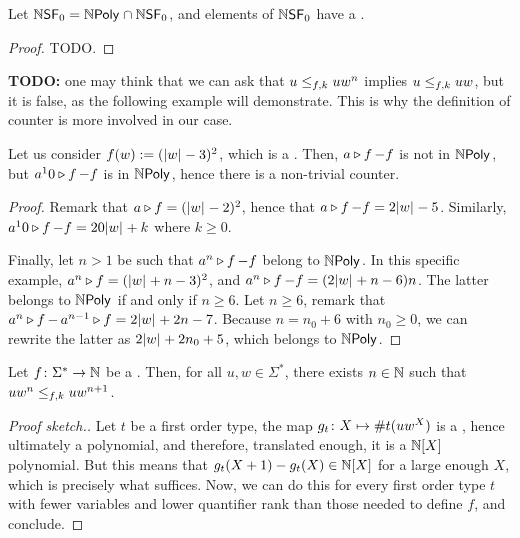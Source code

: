 \begin{lemma}
    Let $\NSF[0] = \NPoly \cap \NSF[0]$,
    and elements of $\NSF[0]$
    have a  .
\end{lemma}
\begin{proof}
    TODO.
\end{proof}


\textbf{TODO:} one may think that we can ask that $u \resleq{f}{k} u w^n$
implies $u \resleq{f}{k} uw$, but it is false, as the following example will
demonstrate. This is why the definition of counter is more involved in our
case.

\begin{example}
    Let us consider $f(w) \defined (\card{w} - 3)^2$, 
    which is a .
    Then,
    $\app{f}{a} - f$ is not in $\NPoly$,
    but
    $\app{f}{a^10} - f$ is in $\NPoly$,
    hence there is a non-trivial counter.
\end{example}
\begin{proof}
    Remark that $\app{f}{a} = (\card{w} - 2)^2$,
    hence that $\app{f}{a}- f = 2\card{w} - 5$.
    Similarly, $\app{f}{a^10} - f = 20\card{w} + k$ where $k \geq 0$.

    Finally,
    let $n > 1$ be such that
    $\app{f}{a^n} - f$ belong to $\NPoly$.
    In this specific example,
    $\app{f}{a^n} = (\card{w} + n -3)^2$,
    and $\app{f}{a^n} - f = (2 \card{w} + n - 6)n$.
    The latter belongs to $\NPoly$ if and only if
    $n \geq 6$. Let $n \geq 6$, 
    remark that
    $\app{f}{a^n} - \app{f}{a^{n-1}}
    = 2 \card{w} + 2n - 7$. Because $n = n_0 + 6$ with $n_0 \geq 0$,
    we can rewrite the latter 
    as $2 \card{w} + 2n_0 + 5$, which belongs to $\NPoly$.
\end{proof}

\begin{lemma}
    \label{sf-no-periods-on-sequences:lemma}
    Let $f \colon \Sigma^* \to \Nat$ be a . Then,
    for all $u, w \in \Sigma^*$,
    there exists $n \in \Nat$ such that
    $u w^n \resleq{f}{k} u w^{n+1}$.
\end{lemma}
\begin{proof}[Proof sketch.]
    Let $t$ be a first order type,
    the map $g_t \colon X \mapsto \vcount{t}(uw^X)$ is a
     ,
    hence ultimately a polynomial, and therefore,
    translated enough, it is a $\Nat[X]$ polynomial.
    But this means that $g_t(X+1) - g_t(X) \in \Nat[X]$ for a large
    enough $X$, which is precisely what suffices.
    Now, we can do this for every first order type $t$
    with fewer variables and lower quantifier rank than those
    needed to define $f$, and conclude.
\end{proof}

